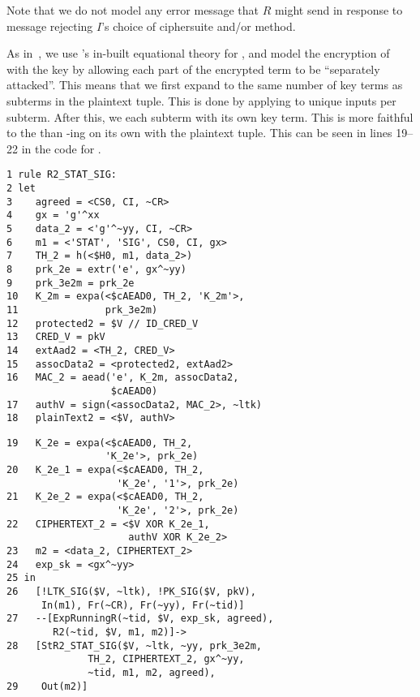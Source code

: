 Note that we do not model any error message that $R$ might send in response to message \mMsgone rejecting $I$'s choice of ciphersuite and/or method.
%

As in~\cite{Norr21}, we use \mTamarin's in-built equational theory for \mXor{}, and model the \mXor{} encryption of  with the key  by allowing each part of the encrypted term to be ``separately attacked''.
%
This means that we first expand  to the same number of key terms as subterms in the plaintext tuple.
%
This is done by applying \mHkdfExpand{} to unique inputs per subterm.
%
After this, we \mXor{} each subterm with its own key term.
%
This is more faithful to the \mSpec{} than \mXor-ing  on its own with the plaintext tuple.
%
This can be seen in lines 19--22 in the code for .

{
\bgroup
\parindent 0pt
\begin{minipage}{0.49\textwidth}
\bgroup
\parindent 0pt
\begin{scriptsize}
\begin{verbatim}
1 rule R2_STAT_SIG:
2 let
3    agreed = <CS0, CI, ~CR>
4    gx = 'g'^xx
5    data_2 = <'g'^~yy, CI, ~CR>
6    m1 = <'STAT', 'SIG', CS0, CI, gx>
7    TH_2 = h(<$H0, m1, data_2>)
8    prk_2e = extr('e', gx^~yy)
9    prk_3e2m = prk_2e
10   K_2m = expa(<$cAEAD0, TH_2, 'K_2m'>,
11               prk_3e2m)
12   protected2 = $V // ID_CRED_V
13   CRED_V = pkV
14   extAad2 = <TH_2, CRED_V>
15   assocData2 = <protected2, extAad2>
16   MAC_2 = aead('e', K_2m, assocData2,
                  $cAEAD0)
17   authV = sign(<assocData2, MAC_2>, ~ltk)
18   plainText2 = <$V, authV>
\end{verbatim}
\end{scriptsize}
\egroup
\end{minipage}
\begin{minipage}{0.02\textwidth}
\end{minipage}
\begin{minipage}{0.48\textwidth}
\bgroup
\parindent 0pt
\begin{scriptsize}
\begin{verbatim}
19   K_2e = expa(<$cAEAD0, TH_2,
                 'K_2e'>, prk_2e)
20   K_2e_1 = expa(<$cAEAD0, TH_2,
                   'K_2e', '1'>, prk_2e)
21   K_2e_2 = expa(<$cAEAD0, TH_2,
                   'K_2e', '2'>, prk_2e)
22   CIPHERTEXT_2 = <$V XOR K_2e_1,
                     authV XOR K_2e_2>
23   m2 = <data_2, CIPHERTEXT_2>
24   exp_sk = <gx^~yy>
25 in
26   [!LTK_SIG($V, ~ltk), !PK_SIG($V, pkV),
      In(m1), Fr(~CR), Fr(~yy), Fr(~tid)]
27   --[ExpRunningR(~tid, $V, exp_sk, agreed),
        R2(~tid, $V, m1, m2)]->
28   [StR2_STAT_SIG($V, ~ltk, ~yy, prk_3e2m,
              TH_2, CIPHERTEXT_2, gx^~yy,
              ~tid, m1, m2, agreed),
29    Out(m2)]
\end{verbatim}
\end{scriptsize}
\egroup
\end{minipage}
\\
\egroup
%
}

